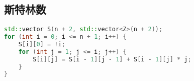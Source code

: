 \subsection{斯特林数}
\begin{lstlisting}[language=c++]
std::vector S(n + 2, std::vector<Z>(n + 2));
for (int i = 0; i <= n + 1; i++) {
    S[i][0] = !i;
    for (int j = 1; j <= i; j++) {
        S[i][j] = S[i - 1][j - 1] + S[i - 1][j] * j;
    }
}
\end{lstlisting}